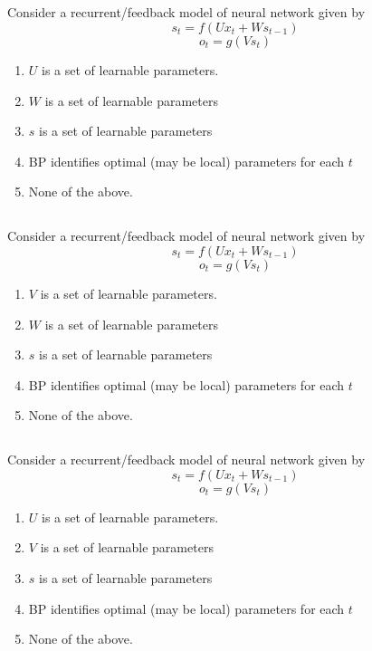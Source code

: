 
\begin{frame}
\section{}
Consider a recurrent/feedback model of neural network given by
\[ s_t = f(Ux_t + W s_{t-1}) \]
\[ o_t = g(V s_t) \]

\begin{enumerate}[label=(\Alph*)]
\item $U$ is a set of learnable parameters.   %
\item $W$ is a set of learnable parameters    %
\item $s$ is a set of learnable parameters
\item BP identifies optimal (may be local) parameters for each $t$
\item None of the above.   %
\end{enumerate}

\end{frame}

\begin{frame}
\section{}
Consider a recurrent/feedback model of neural network given by
\[ s_t = f(Ux_t + W s_{t-1}) \]
\[ o_t = g(V s_t) \]

\begin{enumerate}[label=(\Alph*)]
\item $V$ is a set of learnable parameters.   %
\item $W$ is a set of learnable parameters    %
\item $s$ is a set of learnable parameters
\item BP identifies optimal (may be local) parameters for each $t$
\item None of the above.   %
\end{enumerate}
\end{frame}

\begin{frame}
\section{}
Consider a recurrent/feedback model of neural network given by
\[ s_t = f(Ux_t + W s_{t-1}) \]
\[ o_t = g(V s_t) \]

\begin{enumerate}[label=(\Alph*)]
\item $U$ is a set of learnable parameters.    %
\item $V$ is a set of learnable parameters    %
\item $s$ is a set of learnable parameters
\item BP identifies optimal (may be local) parameters for each $t$
\item None of the above.   %
\end{enumerate}
\end{frame}

